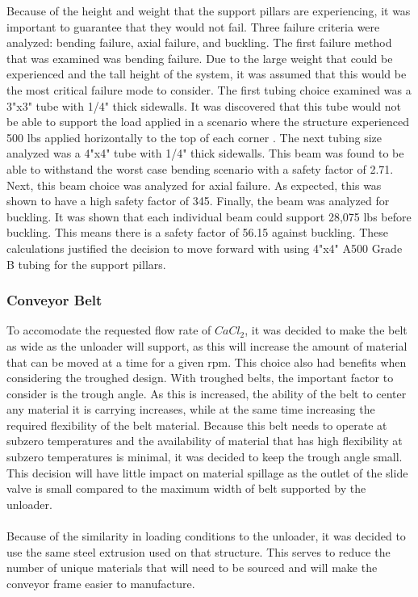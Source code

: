 \documentclass[10pt]{project}
\begin{document}
\noindent Because of the height and weight that the support pillars are experiencing, it was important to guarantee that they would not fail.  Three failure criteria were analyzed: bending failure, axial failure, and buckling.  The first failure method that was examined was bending failure.  Due to the large weight that could be experienced and the tall height of the system, it was assumed that this would be the most critical failure mode to consider.  The first tubing choice examined was a 3"x3" tube with 1/4" thick sidewalls.  It was discovered that this tube would not be able to support the load applied in a scenario where the structure experienced 500 lbs applied horizontally to the top of each corner .  The next tubing size analyzed was a 4"x4" tube with 1/4" thick sidewalls.  This beam was found to be able to withstand the worst case bending scenario with a safety factor of 2.71.  Next, this beam choice was analyzed for axial failure.  As expected, this was shown to have a high safety factor of 345.  Finally, the beam was analyzed for buckling.  It was shown that each individual beam could support 28,075 lbs before buckling.  This means there is a safety factor of 56.15 against buckling.  These calculations justified the decision to move forward with using 4"x4" A500 Grade B tubing for the support pillars.


\subsubsection{Conveyor Belt} \label{sec:designBelt}
To accomodate the requested flow rate of $CaCl_2$, it was decided to make the belt as wide as the unloader will support, as this will increase the amount of material that can be moved at a time for a given rpm.  This choice also had benefits when considering the troughed design.  With troughed belts, the important factor to consider is the trough angle.  As this is increased, the ability of the belt to center any material it is carrying increases, while at the same time increasing the required flexibility of the belt material.  Because this belt needs to operate at subzero temperatures and the availability of material that has high flexibility at subzero temperatures is minimal, it was decided to keep the trough angle small.  This decision will have little impact on material spillage as the outlet of the slide valve is small compared to the maximum width of belt supported by the unloader.
\\\\
Because of the similarity in loading conditions to the unloader, it was decided to use the same steel extrusion used on that structure.  This serves to reduce the number of unique materials that will need to be sourced and will make the conveyor frame easier to manufacture.
\end{document}
